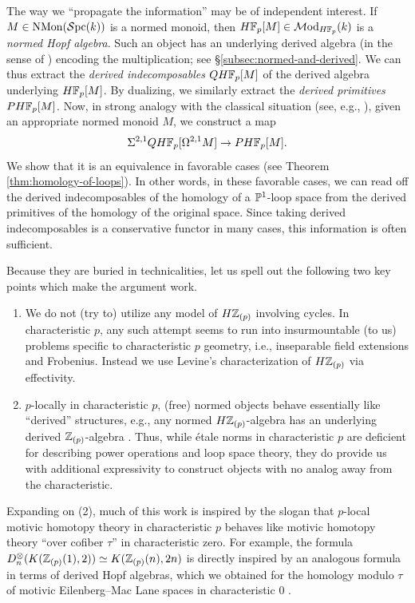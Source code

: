 \documentclass{amsart}
\numberwithin{proposition}{section}
\numberwithin{equation}{section}
\def\NMon{\mathrm{NMon}}
\begin{document}
\begin{remark}
The way we ``propagate the information'' may be of independent interest.
If $M \in \NMon(\Spc(k))$ is a normed monoid, then $H\F_p[M] \in \Mod_{H\F_p}(k)$ is a \emph{normed Hopf algebra}.
Such an object has an underlying derived algebra (in the sense of \cite[Definition~4.2.22]{raksit2020hochschild}) encoding the multiplication; see \S\ref{subsec:normed-and-derived}.
We can thus extract the \emph{derived indecomposables} $QH\F_p[M]$ of the derived algebra underlying $H\F_p[M]$.
By dualizing, we similarly extract the \emph{derived primitives} $PH\F_p[M]$.
Now, in strong analogy with the classical situation (see, e.g., \cite[Lemma~6.3.6]{neisendorfer-algebraic}), given an appropriate normed monoid $M$, we construct a map \[ \Sigma^{2,1}QH\F_p[\Omega^{2,1}M] \to PH\F_p[M]. \]
We show that it is an equivalence in favorable cases (see Theorem \ref{thm:homology-of-loops}).
In other words, in these favorable cases, we can read off the derived indecomposables of the homology of a $\P^1$-loop space from the derived primitives of the homology of the original space.
Since taking derived indecomposables is a conservative functor in many cases, this information is often sufficient.
\end{remark}

\begin{remark}
Because they are buried in technicalities, let us spell out the following two key points which make the argument work.
\begin{enumerate}
\item We do not (try to) utilize any model of $H\Z_{(p)}$ involving cycles.
  In characteristic $p$, any such attempt seems to run into insurmountable (to us) problems specific to characteristic $p$ geometry, i.e., inseparable field extensions and Frobenius.
  Instead we use Levine's characterization of $H\Z_{(p)}$ via effectivity.
\item $p$-locally in characteristic $p$, (free) normed objects behave essentially like ``derived'' structures, e.g., any normed $H\Z_{(p)}$-algebra has an underlying derived $\Z_{(p)}$-algebra \cite{bachmann-linearity}.
  Thus, while étale norms in characteristic $p$ are deficient for describing power operations and loop space theory, they do provide us with additional expressivity to construct objects with no analog away from the characteristic.
\end{enumerate}
Expanding on (2), much of this work is inspired by the slogan that $p$-local motivic homotopy theory in characteristic $p$ behaves like motivic homotopy theory ``over cofiber $\tau$'' in characteristic zero.
For example, the formula $D_n^\otimes(K(\Z_{(p)}(1),2)) \wequi K(\Z_{(p)}(n),2n)$ is directly inspired by an analogous formula in terms of derived Hopf algebras, which we obtained for the homology modulo $\tau$ of motivic Eilenberg--Mac Lane spaces in characteristic $0$ \cite[Theorem~3.16]{bachmann-wilson}.
\end{remark}
\end{document}

